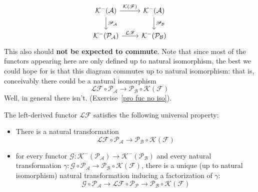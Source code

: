 \[\begin{tikzcd}
\mathcal{K}^-(\mathcal{A})\ar[d,"\mathscr{P}_{\mathcal{A}}"]\ar[r,"\mathcal{K}(\mathscr{F})"]&\mathcal{K}^-(\mathcal{A})\ar[d,"\mathscr{P}_{\mathcal{B}}"]\\
\mathcal{K}^-(\mathcal{P}_{\mathcal{A}})\ar[r,"\mathcal{L}\mathscr{F}"]&\mathcal{K}^-(\mathcal{P}_{\mathcal{B}})
\end{tikzcd}\]
This also should \textbf{not be expected to commute}. Note that since most of the functors appearing here are only defined up to natural isomorphism, the best we could hope for is that this diagram commutes up to natural isomorphism: that is, conceivably there could be a natural isomorphism
\[\mathcal{L}\mathscr{F}\circ\mathscr{P}_{\mathcal{A}}\to\mathscr{P}_{\mathcal{B}}\circ\mathcal{K}(\mathscr{F})\]
Well, in general there isn't. (Exercise~\ref{pro fuc no iso}).
\begin{proposition}\label{der fuc uni}
The left-derived functor $\mathcal{L}\mathscr{F}$ satisfies the following universal property:
\begin{itemize}
\item There is a natural transformation
\[\mathcal{L}\mathscr{F}\circ\mathscr{P}_{\mathcal{A}}\to\mathscr{P}_{\mathcal{B}}\circ\mathcal{K}(\mathscr{F})\]
\item for every functor $\mathscr{G}:\mathcal{K}^-(\mathcal{P}_{\mathcal{A}})\to\mathcal{K}^-(\mathcal{P}_{\mathcal{B}})$ and every natural transformation $\gamma:\mathscr{G}\circ\mathscr{P}_{\mathcal{A}}\to\mathscr{P}_{\mathcal{B}}\circ\mathcal{K}(\mathscr{F})$, there is a unique (up to natural isomorphism) natural transformation inducing a factorization of $\gamma$:
\[\mathscr{G}\circ\mathscr{P}_{\mathcal{A}}\to\mathcal{L}\mathscr{F}\circ\mathscr{P}_{\mathcal{P}}\to\mathscr{P}_{\mathcal{B}}\circ\mathcal{K}(\mathscr{F})\]
\end{itemize}
\end{proposition}
